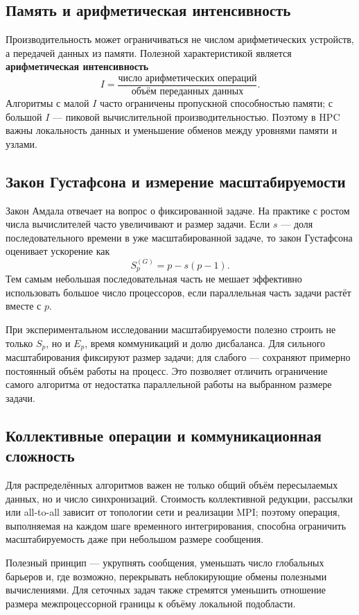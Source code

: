 \subsection{Память и арифметическая интенсивность}

Производительность может ограничиваться не числом арифметических устройств, а передачей данных из памяти. Полезной характеристикой является \textbf{арифметическая интенсивность}
\[
I=\frac{\text{число арифметических операций}}{\text{объём переданных данных}}.
\]
Алгоритмы с малой $I$ часто ограничены пропускной способностью памяти; с большой $I$ --- пиковой вычислительной производительностью. Поэтому в HPC важны локальность данных и уменьшение обменов между уровнями памяти и узлами.


\subsection{Закон Густафсона и измерение масштабируемости}

Закон Амдала отвечает на вопрос о фиксированной задаче. На практике с ростом
числа вычислителей часто увеличивают и размер задачи. Если $s$ --- доля
последовательного времени в уже масштабированной задаче, то закон Густафсона
оценивает ускорение как
\[
\boxed{S_p^{(G)}=p-s(p-1)}.
\]
Тем самым небольшая последовательная часть не мешает эффективно использовать
большое число процессоров, если параллельная часть задачи растёт вместе с $p$.

При экспериментальном исследовании масштабируемости полезно строить не только
$S_p$, но и $E_p$, время коммуникаций и долю дисбаланса. Для сильного
масштабирования фиксируют размер задачи; для слабого --- сохраняют примерно
постоянный объём работы на процесс. Это позволяет отличить ограничение самого
алгоритма от недостатка параллельной работы на выбранном размере задачи.

\subsection{Коллективные операции и коммуникационная сложность}

Для распределённых алгоритмов важен не только общий объём пересылаемых данных,
но и число синхронизаций. Стоимость коллективной редукции, рассылки или
all-to-all зависит от топологии сети и реализации MPI; поэтому операция,
выполняемая на каждом шаге временного интегрирования, способна ограничить
масштабируемость даже при небольшом размере сообщения.

Полезный принцип --- укрупнять сообщения, уменьшать число глобальных барьеров и,
где возможно, перекрывать неблокирующие обмены полезными вычислениями. Для
сеточных задач также стремятся уменьшить отношение размера межпроцессорной
границы к объёму локальной подобласти.

